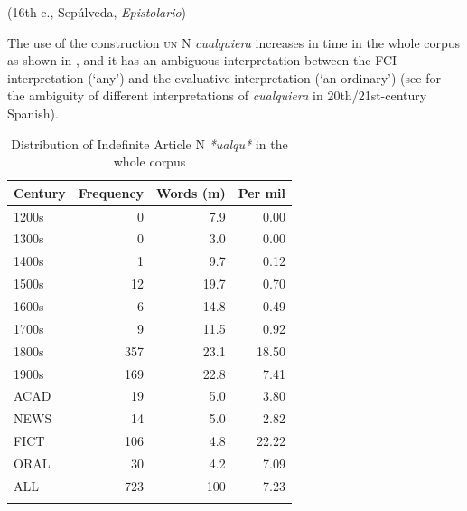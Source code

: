   (16th c., Sepúlveda, \textit{Epistolario})
\z

The use of the construction \textsc{un} N \textit{cualquiera} increases in time in the whole corpus as shown in , and it has an ambiguous interpretation between the FCI interpretation (‘any’) and the evaluative interpretation (‘an ordinary’) (see  for the ambiguity of different interpretations of \textit{cualquiera} in 20th/21st-century Spanish).

\begin{table}

\begin{tabular}{lrrr}
\lsptoprule
Century &  Frequency &  Words (m) &  Per mil \\
\midrule
1200s &  0 &  7.9    &  0.00   \\
1300s &  0 &  3.0    &  0.00  \\
1400s &  1 &  9.7    &  0.12   \\
1500s &  12 &  19.7  &  0.70   \\
1600s &  6 &  14.8   &  0.49   \\
1700s &  9 &  11.5   &  0.92   \\
1800s &  357 &  23.1 &  18.50  \\
1900s &  169 &  22.8 &  7.41  \\
\tablevspace
ACAD &  19 &  5.0    &  3.80  \\
NEWS &  14 &  5.0    &  2.82  \\
FICT &  106 &  4.8   &  22.22 \\
ORAL &  30 &  4.2    &  7.09 \\
\midrule
ALL  &  723 & 100    &  7.23 \\
\lspbottomrule
\end{tabular}

\caption{Distribution of Indefinite Article N \textit{*ualqu*} in the whole corpus}
\label{tab:extracted7}
\end{table}

